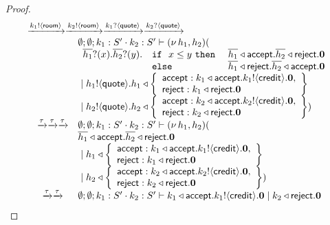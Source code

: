 \begin{proof}
\[\begin{array}{rcl}
		\multicolumn{3}{l}{
		\by{\bactout{k_1}{\rtype}} \by{\bactout{k_2}{\rtype}} \by{\bactinp{k_1}{\Quote}} \by{\bactinp{k_2}{\Quote} }
		}
	\\

		&& \es; \es; k_1: S' \cat k_2: S' \proves \newsp{h_1, h_2}{\\
		&&
			\begin{array}{lll}
				\binp{\dual{h_1}}{x} \binp{\dual{h_2}}{y} & \If\ x \leq y\ \Then & \bsel{\dual{h_1}}{\accept} \bsel{\dual{h_2}}{\reject} \inact\\
				& \Else& \bsel{\dual{h_1}}{\reject} \bsel{\dual{h_2}}{\accept} \inact
			\end{array}\\
		&& \Par
		\bout{h_1}{\Quote}
		h_1 \triangleleft \left\{
				\begin{array}{l}
					\accept: \bsel{k_1}{\accept} \bout{k_1}{\creditc} \inact,\\
					\reject: \bsel{k_1}{\reject} \inact
				\end{array}
				\right\} \\
		&& \Par
		\bout{h_2}{\Quote}
		h_2 \triangleleft \left\{
				\begin{array}{l}
					\accept: \bsel{k_2}{\accept} \bout{k_2}{\creditc} \inact,\\
					\reject: \bsel{k_2}{\reject} \inact
				\end{array}
				\right\} }
	\\

		&\by{\tau} \by{\tau} \by{\tau}&
		\es; \es; k_1: S' \cat k_2: S' \proves \newsp{h_1, h_2}{\\
		&& \bsel{\dual{h_1}}{\accept} \bsel{\dual{h_2}}{\reject} \inact\\
		&& \Par
		h_1 \triangleleft \left\{
				\begin{array}{l}
					\accept: \bsel{k_1}{\accept} \bout{k_1}{\creditc} \inact,\\
					\reject: \bsel{k_1}{\reject} \inact
				\end{array}
				\right\} \\
		&& \Par
		h_2 \triangleleft \left\{
				\begin{array}{l}
					\accept: \bsel{k_2}{\accept} \bout{k_2}{\creditc} \inact,\\
					\reject: \bsel{k_2}{\reject} \inact
				\end{array}
				\right\} }
	\\

		&\by{\tau} \by{\tau}&
		\es; \es; k_1: S' \cat k_2: S' \proves
		\bsel{k_1}{\accept} \bout{k_1}{\creditc} \inact 
		\Par \bsel{k_2}{\reject} \inact
	\\


\end{array}\]
\end{proof}
